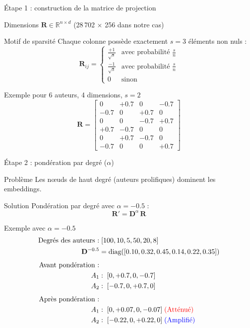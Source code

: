 \documentclass[9pt,aspectratio=169,professionalfonts]{beamer}
\begin{document}
\begin{frame}{Étape 1 : construction de la matrice de projection}
\begin{block}{Dimensions}
$\mathbf R \in \mathbb R^{n\times d}$ (28\,702 × 256 dans notre cas)
\end{block}

\begin{block}{Motif de sparsité}
Chaque colonne possède exactement $s=3$ éléments non nuls :
$$\mathbf R_{ij} = \begin{cases}
\tfrac{+1}{\sqrt s} & \text{avec probabilité } \tfrac{s}{n}\\[2pt]
\tfrac{-1}{\sqrt s} & \text{avec probabilité } \tfrac{s}{n}\\[2pt]
0 & \text{sinon}
\end{cases}$$
\end{block}

\begin{exampleblock}{Exemple pour 6 auteurs, 4 dimensions, $s=2$}
$$\mathbf R = \begin{bmatrix}
0 & +0.7 & 0 & -0.7 \\
-0.7 & 0 & +0.7 & 0 \\
0 & 0 & -0.7 & +0.7 \\
+0.7 & -0.7 & 0 & 0 \\
0 & +0.7 & -0.7 & 0 \\
-0.7 & 0 & 0 & +0.7
\end{bmatrix}$$
\end{exampleblock}
\end{frame}

\begin{frame}{Étape 2 : pondération par degré ($\alpha$)}
\begin{alertblock}{Problème}
Les nœuds de haut degré (auteurs prolifiques) dominent les embeddings.
\end{alertblock}

\begin{block}{Solution}
Pondération par degré avec $\alpha=-0.5$ :
$$\boxed{\mathbf R' = \mathbf D^{\alpha}\,\mathbf R}$$
\end{block}

\begin{exampleblock}{Exemple avec $\alpha=-0.5$}
\begin{align*}
\text{Degrés des auteurs :} &\; [100, 10, 5, 50, 20, 8]\\
\mathbf D^{-0.5} &= \text{diag}([0.10, 0.32, 0.45, 0.14, 0.22, 0.35])\\[4pt]
\text{Avant pondération :} \\
A_1 &:\; [0, +0.7, 0, -0.7]\\
A_2 &:\; [-0.7, 0, +0.7, 0]\\[4pt]
\text{Après pondération :} \\
A_1 &:\; [0, +0.07, 0, -0.07] \; \text{\color{red}(Atténué)}\\
A_2 &:\; [-0.22, 0, +0.22, 0] \; \text{\color{blue}(Amplifié)}
\end{align*}
\end{exampleblock}
\end{frame}
\end{document}
